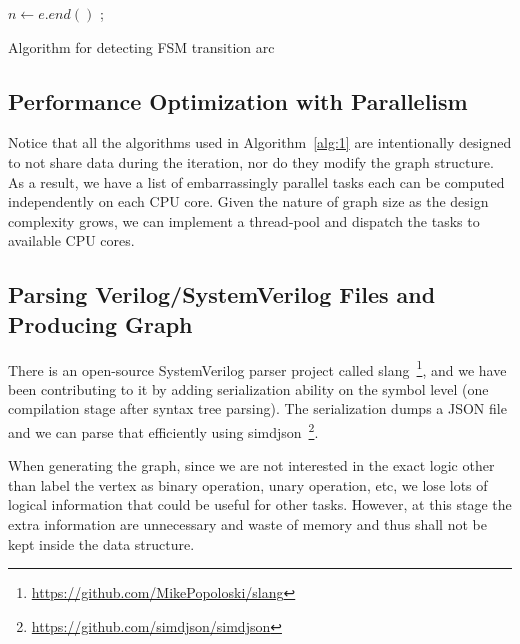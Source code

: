 \documentclass{article}
\begin{document}
\begin{algorithm}[htb]
    \label{alg:6}
     {
         {
            \;
        }

        $n \gets e.end()$\;
         {
            ;
        }
    }
    \;
 \caption{Algorithm for detecting FSM transition arc}
\end{algorithm}

\subsection{Performance Optimization with Parallelism}
Notice that all the algorithms used in Algorithm~\ref{alg:1} are intentionally designed to not
share data during the iteration, nor do they modify the graph structure. As a result, we have
a list of embarrassingly parallel tasks each can be computed independently on each CPU core.
Given the nature of graph size as the design complexity grows, we can implement a thread-pool
and dispatch the tasks to available CPU cores.

\subsection{Parsing Verilog/SystemVerilog Files and Producing Graph}
There is an open-source SystemVerilog parser project called
slang~\footnote{\url{https://github.com/MikePopoloski/slang}}, and we have been contributing
to it by adding serialization ability on the symbol level (one compilation stage after syntax
tree parsing). The serialization dumps a JSON file and we can parse that efficiently using
simdjson~\footnote{\url{https://github.com/simdjson/simdjson}}.

When generating the graph, since we are not interested in the exact logic other than label
the vertex as binary operation, unary operation, etc, we lose lots of logical information
that could be useful for other tasks. However, at this stage the extra information are
unnecessary and waste of memory and thus shall not be kept inside the data structure.
\end{document}
